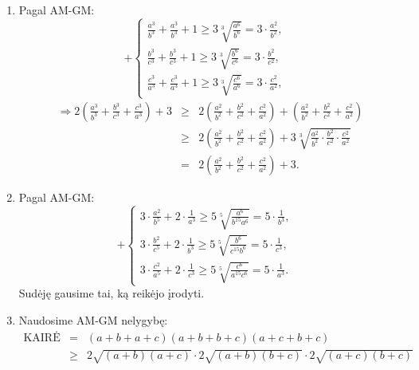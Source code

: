 \begin{enumerate}
$$\begin{array}{ll}
    \frac{c+a}{\sqrt{b}}+2\sqrt{b}=\frac{c}{\sqrt{b}}+\sqrt{b}+\frac{a}{\sqrt{b}}+\sqrt{b}\geq2\sqrt{c}+2\sqrt{a},&\\
    \frac{a+b}{\sqrt{c}}+2\sqrt{c}=\frac{a}{\sqrt{c}}+\sqrt{c}+\frac{b}{\sqrt{c}}+\sqrt{c}\geq2\sqrt{a}+2\sqrt{b},&\\
    \sqrt{a}+\sqrt{b}+\sqrt{c}\geq3\sqrt[3]{\sqrt{abc}}=3.&\end{array}\right.$$
    Viską sudėję gausime norimą rezultatą.
\item
    Pagal AM-GM: $$+\left\{\begin{array}{ll}
    \frac{a^3}{b^3}+\frac{a^3}{b^3}+1\geq3\sqrt[3]{\frac{a^6}{b^6}}=3\cdot\frac{a^2}{b^2},&\\
    \frac{b^3}{c^3}+\frac{b^3}{c^3}+1\geq3\sqrt[3]{\frac{b^6}{c^6}}=3\cdot\frac{b^2}{c^2},&\\
    \frac{c^3}{a^3}+\frac{c^3}{a^3}+1\geq3\sqrt[3]{\frac{c^6}{a^6}}=3\cdot\frac{c^2}{a^2},&\end{array}\right.$$
    \begin{eqnarray*}
    \Rightarrow2\left(\frac{a^3}{b^3}+\frac{b^3}{c^3}+\frac{c^3}{a^3}\right)+
    3&\geq&2\left(\frac{a^2}{b^2}+\frac{b^2}{c^2}+\frac{c^2}{a^2}\right)+
    \left(\frac{a^2}{b^2}+\frac{b^2}{c^2}+\frac{c^2}{a^2}\right)\\
    &\geq&2\left(\frac{a^2}{b^2}+\frac{b^2}{c^2}+\frac{c^2}{a^2}\right)+
    3\sqrt[3]{\frac{a^2}{b^2}\cdot\frac{b^2}{c^2}\cdot\frac{c^2}{a^2}}\\
    &=&2\left(\frac{a^2}{b^2}+\frac{b^2}{c^2}+\frac{c^2}{a^2}\right)+3.
    \end{eqnarray*}
\item
    Pagal AM-GM: $$+\left\{\begin{array}{ll}
    3\cdot\frac{a^2}{b^5}+2\cdot\frac{1}{a^3}\geq5\sqrt[5]{\frac{a^6}{b^{15}a^6}}=5\cdot\frac{1}{b^3},&\\
    3\cdot\frac{b^2}{c^5}+2\cdot\frac{1}{b^3}\geq5\sqrt[5]{\frac{b^6}{c^{15}b^6}}=5\cdot\frac{1}{c^3},&\\
    3\cdot\frac{c^2}{a^5}+2\cdot\frac{1}{c^3}\geq5\sqrt[5]{\frac{c^6}{a^{15}c^6}}=5\cdot\frac{1}{a^3}.&
    \end{array} \right. $$ Sudėję gausime tai, ką reikėjo įrodyti.
\item
    Naudosime AM-GM nelygybę: \begin{eqnarray*} \mbox{KAIRĖ
    PUSĖ}&=&(a+b+a+c)(a+b+b+c)(a+c+b+c)\\
    &\geq&2\sqrt{(a+b)(a+c)}\cdot2\sqrt{(a+b)(b+c)}\cdot2\sqrt{(a+c)(b+c)}\\

\end{eqnarray*}
\end{enumerate}
